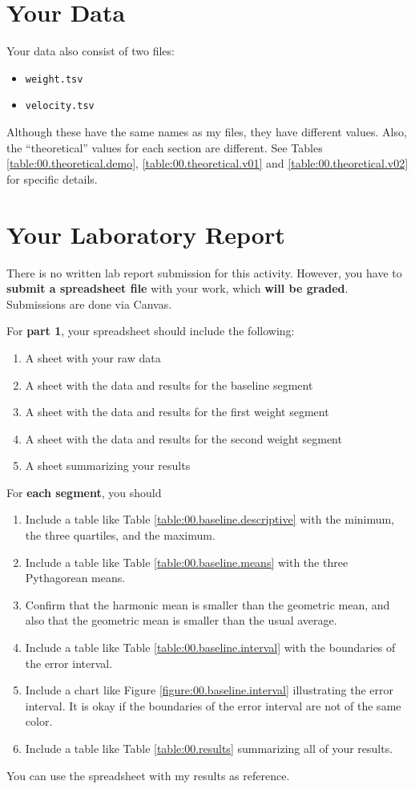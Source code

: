 \section{Your Data}
Your data also consist of two files:
\begin{itemize}
    \item \texttt{weight.tsv}
    \item \texttt{velocity.tsv}
\end{itemize}
Although these have the same names as my files, they have different values. Also, the ``theoretical'' values for each section are different. See Tables \ref{table:00.theoretical.demo}, \ref{table:00.theoretical.v01} and \ref{table:00.theoretical.v02} for specific details.
\newpage
\section{Your Laboratory Report}
There is no written lab report submission for this activity. However, you have to \textbf{submit a spreadsheet file} with your work, which \textbf{will be graded}. Submissions are done via Canvas.

For \textbf{part 1}, your spreadsheet should include the following:
\begin{enumerate}
    \item A sheet with your raw data
    \item A sheet with the data and results for the baseline segment
    \item A sheet with the data and results for the first weight segment
    \item A sheet with the data and results for the second weight segment
    \item A sheet summarizing your results
\end{enumerate}
For \textbf{each segment}, you should
\begin{enumerate}
    \item Include a table like Table \ref{table:00.baseline.descriptive} with the minimum, the three quartiles, and the maximum.
    \item Include a table like Table \ref{table:00.baseline.means} with the three Pythagorean means.
    \item Confirm that the harmonic mean is smaller than the geometric mean, and also that the geometric mean is smaller than the usual average.
    \item Include a table like Table \ref{table:00.baseline.interval} with the boundaries of the error interval.
    \item Include a chart like Figure \ref{figure:00.baseline.interval} illustrating the error interval. It is okay if the boundaries of the error interval are not of the same color.
    \item Include a table like Table \ref{table:00.results} summarizing all of your results.
\end{enumerate}
You can use the spreadsheet with my results as reference.

